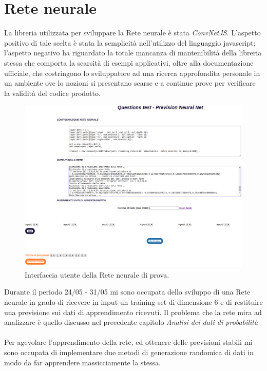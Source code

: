 \section{Rete neurale}
\label{Rete neurale}

La libreria utilizzata per sviluppare la Rete neurale \`e stata \textit{ConvNetJS}. L'aspetto positivo di tale scelta \`e stata la semplicit\`a nell'utilizzo del linguaggio javascript; l'aspetto negativo ha riguardato la totale mancanza di mantenibilit\`a della libreria stessa che comporta la scarsit\`a di esempi applicativi, oltre alla documentazione ufficiale, che costringono lo sviluppatore ad una ricerca approfondita personale in un ambiente ove lo nozioni si presentano scarse e a continue prove per verificare la validit\`a del codice prodotto.
\begin{figure}[H]
\centering
	\includegraphics[width=1\linewidth]{./image/GUI-rete-neurale.png}
	\caption{Interfaccia utente della Rete neurale di prova.}
\end{figure}
\noindent
Durante il periodo 24/05 - 31/05 mi sono occupata dello sviluppo di una Rete neurale in grado di ricevere in input un training set di dimensione 6 e di restituire una previsione sui dati di apprendimento ricevuti.
\noindent
Il problema che la rete mira ad analizzare \`e quello discusso nel precedente capitolo \textit{Analisi dei dati di probabilit\`a}
\\\\
Per agevolare l'apprendimento della rete, ed ottenere delle previsioni stabili mi sono occupata di implementare due metodi di generazione randomica di dati in modo da far apprendere massicciamente la stessa.
